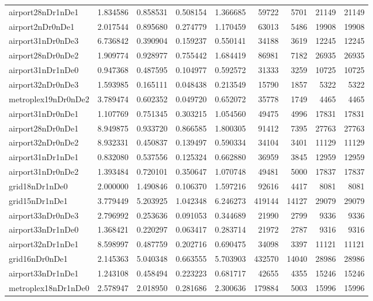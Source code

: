 \begin{longtable}{|l|r|r|r|r|r|r|r|r|}
airport28nDr1nDe1 & 1.834586 & 0.858531 & 0.508154 & 1.366685 & 59722 & 5701 & 21149 & 21149 \\
airport2nDr0nDe1 & 2.017544 & 0.895680 & 0.274779 & 1.170459 & 63013 & 5486 & 19908 & 19908 \\
airport31nDr0nDe3 & 6.736842 & 0.390904 & 0.159237 & 0.550141 & 34188 & 3619 & 12245 & 12245 \\
airport28nDr0nDe2 & 1.909774 & 0.928977 & 0.755442 & 1.684419 & 86981 & 7182 & 26935 & 26935 \\
airport31nDr1nDe0 & 0.947368 & 0.487595 & 0.104977 & 0.592572 & 31333 & 3259 & 10725 & 10725 \\
airport32nDr0nDe3 & 1.593985 & 0.165111 & 0.048438 & 0.213549 & 15790 & 1857 & 5322 & 5322 \\
metroplex19nDr0nDe2 & 3.789474 & 0.602352 & 0.049720 & 0.652072 & 35778 & 1749 & 4465 & 4465 \\
airport31nDr0nDe1 & 1.107769 & 0.751345 & 0.303215 & 1.054560 & 49475 & 4996 & 17831 & 17831 \\
airport28nDr0nDe1 & 8.949875 & 0.933720 & 0.866585 & 1.800305 & 91412 & 7395 & 27763 & 27763 \\
airport32nDr0nDe2 & 8.932331 & 0.450837 & 0.139497 & 0.590334 & 34104 & 3401 & 11129 & 11129 \\
airport31nDr1nDe1 & 0.832080 & 0.537556 & 0.125324 & 0.662880 & 36959 & 3845 & 12959 & 12959 \\
airport31nDr0nDe2 & 1.393484 & 0.720101 & 0.350647 & 1.070748 & 49481 & 5000 & 17837 & 17837 \\
grid18nDr1nDe0 & 2.000000 & 1.490846 & 0.106370 & 1.597216 & 92616 & 4417 & 8081 & 8081 \\
grid15nDr1nDe1 & 3.779449 & 5.203925 & 1.042348 & 6.246273 & 419144 & 14127 & 29079 & 29079 \\
airport33nDr0nDe3 & 2.796992 & 0.253636 & 0.091053 & 0.344689 & 21990 & 2799 & 9336 & 9336 \\
airport33nDr1nDe0 & 1.368421 & 0.220297 & 0.063417 & 0.283714 & 21972 & 2787 & 9316 & 9316 \\
airport32nDr1nDe1 & 8.598997 & 0.487759 & 0.202716 & 0.690475 & 34098 & 3397 & 11121 & 11121 \\
grid16nDr0nDe1 & 2.145363 & 5.040348 & 0.663555 & 5.703903 & 432570 & 14040 & 28986 & 28986 \\
airport33nDr1nDe1 & 1.243108 & 0.458494 & 0.223223 & 0.681717 & 42655 & 4355 & 15246 & 15246 \\
metroplex18nDr1nDe0 & 2.578947 & 2.018950 & 0.281686 & 2.300636 & 179884 & 5003 & 15996 & 15996 \\

\end{longtable}
